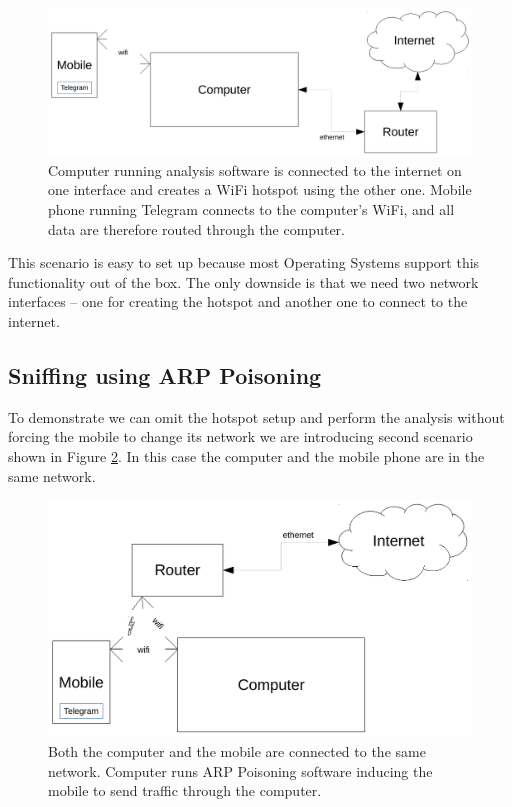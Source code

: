 \documentclass[thesis=M,english]{FITthesis}[2012/10/20]
\begin{document}
\begin{figure}[htb]
	\centering
	\includegraphics[width=1\textwidth]{setup-hotspot.pdf}
	\caption[Analysis setup 1]{Computer running analysis software is connected to the internet on one interface and creates a WiFi hotspot using the other one. Mobile phone running Telegram connects to the computer's WiFi, and all data are therefore routed through the computer.}
	\label{img:analysis-setup-hotspot}
\end{figure}

This scenario is easy to set up because most Operating Systems support this functionality out of the box. The only downside is that we need two network interfaces -- one for creating the hotspot and another one to connect to the internet.


\subsection{Sniffing using ARP Poisoning}

To demonstrate we can omit the hotspot setup and perform the analysis without forcing the mobile to change its network we are introducing second scenario shown in Figure \ref{img:analysis-setup-arp}. In this case the computer and the mobile phone are in the same network.

\begin{figure}[htb]
	\centering
	\includegraphics[width=1\textwidth]{setup-arp.pdf}
	\caption[Analysis setup 2]{Both the computer and the mobile are connected to the same network. Computer runs ARP Poisoning software inducing the mobile to send traffic through the computer.}
	\label{img:analysis-setup-arp}
\end{figure}
\end{document}

